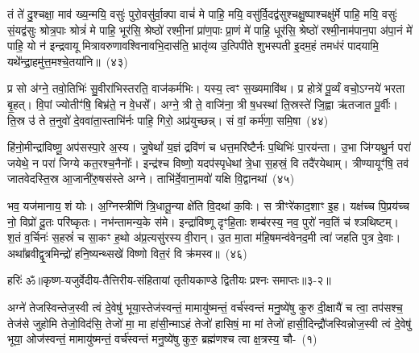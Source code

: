 तं ते॑ दु॒श्चक्षा॒ माव॑ ख्य॒न्मयि॒ वसुः॑ पुरो॒वसु॑र्वा॒क्पा वाचं॑ मे पाहि॒ मयि॒ वसु॑र्वि॒दद्व॑सुश्चक्षु॒ष्पाश्चक्षु॑र्मे पाहि॒ मयि॒ वसुः॑ सं॒यद्व॑सुः श्रोत्र॒पाः श्रोत्रं॑ मे पाहि॒ भूर॑सि॒ श्रेष्ठो॑ रश्मी॒नां प्रा॑ण॒पाः प्रा॒णं मे॑ पाहि॒ धूर॑सि॒ श्रेष्ठो॑ रश्मी॒नाम॑पान॒पा अ॑पा॒नं मे॑ पाहि॒ यो न॑ इन्द्रवायू मित्रावरुणावश्विनावभि॒दास॑ति॒ भ्रातृ॑व्य उ॒त्पिपी॑ते शुभस्पती इ॒दम॒हं तमध॑रं पादयामि॒ यथे᳚न्द्रा॒हमु॑त्त॒मश्चे॒तया॑नि॥~(४३)

{\anuvakamend[{र॒क्ष॒स्व॒ भ्रातृ॑व्य॒स्त्रयो॑दश च}]}%

प्र सो अ॑ग्ने॒ तवो॒तिभिः॑ सु॒वीरा॑भिस्तरति॒ वाज॑कर्मभिः। यस्य॒ त्वꣳ स॒ख्यमावि॑थ। प्र होत्रे॑ पू॒र्व्यं वचो॒\-ऽग्नये॑ भरता बृ॒हत्। वि॒पां ज्योतीꣳ॑षि॒ बिभ्र॑ते॒ न वे॒धसे᳚। अग्ने॒ त्री ते॒ वाजि॑ना॒ त्री ष॒धस्था॑ ति॒स्रस्ते॑ जि॒ह्वा ऋ॑तजात पू॒र्वीः। ति॒स्र उ॑ ते त॒नुवो॑ दे॒ववा॑ता॒स्ताभि॑र्नः पाहि॒ गिरो॒ अप्र॑युच्छन्न्। सं वां॒ कर्म॑णा॒ समि॒षा~(४४)

हि॑नो॒मीन्द्रा॑विष्णू॒ अप॑सस्पा॒रे अ॒स्य। जु॒षेथां᳚ य॒ज्ञं द्रवि॑णं च धत्त॒मरि॑ष्टैर्नः प॒थिभिः॑ पा॒रय॑न्ता। उ॒भा जि॑ग्यथु॒र्न परा॑ जयेथे॒ न परा॑ जिग्ये कत॒रश्च॒नैनोः᳚। इन्द्र॑श्च विष्णो॒ यदप॑स्पृधेथां त्रे॒धा स॒हस्रं॒ वि तदै॑रयेथाम्। त्रीण्यायूꣳ॑षि॒ तव॑ जातवेदस्ति॒स्र आ॒जानी॑रु॒षस॑स्ते अग्ने। ताभि॑र्दे॒वाना॒मवो॑ यक्षि वि॒द्वानथा॑~(४५)

भव॒ यज॑मानाय॒ शं योः। अ॒ग्निस्त्रीणि॑ त्रि॒धातू॒न्या क्षे॑ति वि॒दथा॑ क॒विः। स त्रीꣳरे॑काद॒शाꣳ इ॒ह। यक्ष॑च्च पि॒प्रय॑च्च नो॒ विप्रो॑ दू॒तः परि॑ष्कृतः। नभ॑न्तामन्य॒के स॑मे। इन्द्रा॑विष्णू दृꣳहि॒ताः शम्ब॑रस्य॒ नव॒ पुरो॑ नव॒तिं च॑ श्ञथिष्टम्। श॒तं व॒र्चिनः॑ स॒हस्रं॑ च सा॒कꣳ ह॒थो अ॑प्र॒त्यसु॑रस्य वी॒रान्। उ॒त मा॒ता म॑हि॒षमन्व॑वेनद॒मी त्वा॑ जहति पुत्र दे॒वाः। अथा᳚ब्रवीद्वृ॒त्रमिन्द्रो॑ हनि॒ष्यन्थ्सखे॑ विष्णो वित॒रं वि क्र॑मस्व॥~(४६)

{\anuvakamend[{इ॒षा\-ऽथ॑ त्वा॒ त्रयो॑दश च}]}%

{हरिः॑ ॐ}{॥कृष्ण-यजुर्वेदीय-तैत्तिरीय-संहितायां तृतीयकाण्डे द्वितीयः प्रश्नः समाप्तः॥३-२॥}

\setcounter{anuvakam}{0}
अग्ने॑ तेजस्विन्तेज॒स्वी त्वं दे॒वेषु॑ भूया॒स्तेज॑स्वन्तं॒ मामायु॑ष्मन्तं॒ वर्च॑स्वन्तं मनु॒ष्ये॑षु कुरु दी॒क्षायै॑ च त्वा॒ तप॑सश्च॒ तेज॑से जुहोमि तेजो॒विद॑सि॒ तेजो॑ मा॒ मा हा॑सी॒न्मा\-ऽहं तेजो॑ हासिषं॒ मा मां तेजो॑ हासी॒दिन्द्रौ॑जस्विन्नोज॒स्वी त्वं दे॒वेषु॑ भूया॒ ओज॑स्वन्तं॒ मामायु॑ष्मन्तं॒ वर्च॑स्वन्तं मनु॒ष्ये॑षु कुरु॒ ब्रह्म॑णश्च त्वा क्ष॒त्रस्य॒ चौ-~(१)

